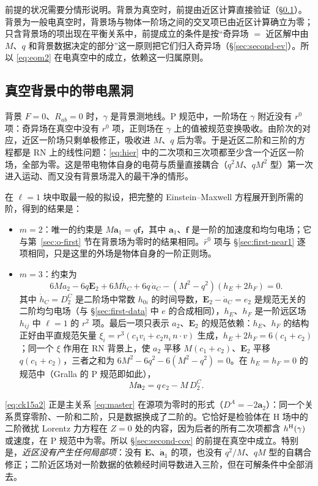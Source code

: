 \documentclass[11pt,a4paper]{ctexart}
\begin{document}
前提的状况需要分情形说明。背景为真空时，前提由近区计算直接验证（\S\ref{sec:second-vac}）。背景为一般电真空时，背景场与物体一阶场之间的交叉项已由近区计算确立为零；只含背景场的项出现在平衡关系中，前提成立的条件是按“奇异场 $=$ 近区解中由 $M$、$q$ 和背景数据决定的部分”这一原则把它们归入奇异场（\S\ref{sec:second-ev}）。所以 \eqref{eq:eom2} 在电真空中的成立，依赖这一归属原则。

\subsection{真空背景中的带电黑洞}\label{sec:second-vac}

背景 $F=0$、$R_{ab}=0$ 时，$\gamma$ 是背景测地线。P 规范中，一阶场在 $\gamma$ 附近没有 $r^0$ 项：奇异场在真空中没有 $r^0$ 项，正则场在 $\gamma$ 上的值被规范变换吸收。由阶次的对应，近区一阶场只剩单极修正，吸收进 $M$、$q$ 后为零。于是近区二阶和三阶的方程都是 RN 上的线性问题：\eqref{eq:hier} 中的二次项和三次项都至少含一个近区一阶场，全部为零。这是带电物体自身的电荷与质量直接耦合（$q^2M$、$qM^2$ 型）第一次进入运动、而又没有背景场混入的最干净的情形。

在 $\ell=1$ 块中取最一般的拟设，把完整的 Einstein--Maxwell 方程展开到所需的阶，得到的结果是：
\begin{itemize}[nosep]
\item $m=2$：唯一的约束是 $M\boldsymbol a_1=q\boldsymbol f$，其中 $\boldsymbol a_1$、$\boldsymbol f$ 是一阶的加速度和均匀电场；它与第~\ref{sec:o-first} 节在背景场为零时的结果相同。$\bar r^0$ 项与 \S\ref{sec:first-near1} 逐项相同，只是这里的外场是物体自身的一阶正则场。
\item $m=3$：约束为
\begin{equation}
6Ma_2-6q\boldsymbol E_2+6M\dot h_C+6q\,\dot a_C-(M^2-q^2)(h_E+2h_F)=0 .
\label{eq:ck15}
\end{equation}
其中 $\dot h_C=D^C_2$ 是二阶场中常数 $h_{0i}$ 的时间导数，$\boldsymbol E_2-\dot a_C=e_2$ 是规范无关的二阶均匀电场（与 \S\ref{sec:first-data} 中 $e$ 的合成相同），$h_E$、$h_F$ 是一阶远区场 $h_{ij}$ 中 $\ell=1$ 的 $r^2$ 项。最后一项只表示 $a_2$、$\boldsymbol E_2$ 的规范依赖：$h_E$、$h_F$ 的结构正好由平直规范矢量 $\xi_i=r^3(c_1v_i+c_2n_i\,n\cdot v)$ 生成，$h_E+2h_F=6(c_1+c_2)$；同一个 $\xi$ 作用在 RN 背景上，使 $a_2$ 平移 $M(c_1+c_2)$、$\boldsymbol E_2$ 平移 $q(c_1+c_2)$，三者之和为 $6M^2-6q^2-6(M^2-q^2)=0$。在 $h_E=h_F=0$ 的规范中（Gralla 的 P 规范即如此），
\begin{equation}
M\boldsymbol a_2=q\,e_2-M\,D^C_2 .
\label{eq:ck15a2}
\end{equation}
\end{itemize}
\eqref{eq:ck15a2} 正是主关系 \eqref{eq:master} 在源项为零时的形式（$D^A=-2\boldsymbol a_2$）：同一个关系贯穿零阶、一阶和二阶，只是数据换成了二阶的。它恰好是检验体在 H 场中的二阶微扰 Lorentz 力方程在 $Z=0$ 处的内容，因为后者的所有二次项都含 $h^{\rm H}(\gamma)$ 或速度，在 P 规范中为零。所以 \S\ref{sec:second-cov} 的前提在真空中成立。特别是，\emph{近区没有产生任何局部项}：没有 $\dot{\boldsymbol E}$、$\dot{\boldsymbol a}_1$ 的项，也没有 $q^2/M$、$qM$ 型的自耦合修正；二阶近区场对一阶数据的依赖经时间导数进入三阶，但在可解条件中全部消去。
\end{document}
